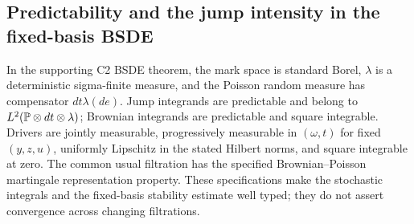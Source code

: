 \subsection{Predictability and the jump intensity in the fixed-basis BSDE}
In the supporting C2 BSDE theorem, the mark space is standard Borel, $\lambda$ is a deterministic sigma-finite measure, and the Poisson random measure has compensator $dt\lambda(de)$. Jump integrands are predictable and belong to $L^2(\mathbb P\otimes dt\otimes\lambda)$; Brownian integrands are predictable and square integrable. Drivers are jointly measurable, progressively measurable in $(\omega,t)$ for fixed $(y,z,u)$, uniformly Lipschitz in the stated Hilbert norms, and square integrable at zero. The common usual filtration has the specified Brownian--Poisson martingale representation property. These specifications make the stochastic integrals and the fixed-basis stability estimate well typed; they do not assert convergence across changing filtrations.

